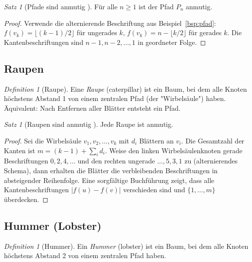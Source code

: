 \documentclass[12pt,a4paper]{amsart}
\theoremstyle{definition}
\theoremstyle{remark}
\newtheorem{satz}[theorem]{Satz}
\newtheorem{definition_de}[theorem]{Definition}
\begin{document}
\begin{satz}[Pfade sind anmutig \cite{Rosa1967}]\label{satz:pfade}
Für alle $n \geq 1$ ist der Pfad $P_n$ anmutig.
\end{satz}

\begin{proof}
Verwende die alternierende Beschriftung aus Beispiel~\ref{bsp:pfad}:
$f(v_k) = \lfloor(k-1)/2\rfloor$ für ungerades $k$,
$f(v_k) = n - \lfloor k/2 \rfloor$ für gerades $k$.
Die Kantenbeschriftungen sind $n-1, n-2, \ldots, 1$ in geordneter Folge.
\end{proof}

\subsection{Raupen}

\begin{definition_de}[Raupe]
Eine \emph{Raupe} (caterpillar) ist ein Baum, bei dem alle Knoten höchstens
Abstand 1 von einem zentralen Pfad (der "Wirbelsäule") haben. Äquivalent:
Nach Entfernen aller Blätter entsteht ein Pfad.
\end{definition_de}

\begin{satz}[Raupen sind anmutig \cite{Rosa1967}]\label{satz:raupen}
Jede Raupe ist anmutig.
\end{satz}

\begin{proof}
Sei die Wirbelsäule $v_1, v_2, \ldots, v_k$ mit $d_i$ Blättern an $v_i$.
Die Gesamtzahl der Kanten ist $m = (k-1) + \sum_i d_i$.
Weise den linken Wirbelsäulenknoten gerade Beschriftungen $0, 2, 4, \ldots$ und
den rechten ungerade $\ldots, 5, 3, 1$ zu (alternierendes Schema), dann erhalten
die Blätter die verbleibenden Beschriftungen in absteigender Reihenfolge.
Eine sorgfältige Buchführung zeigt, dass alle Kantenbeschriftungen $|f(u) - f(v)|$
verschieden sind und $\{1, \ldots, m\}$ überdecken.
\end{proof}

\subsection{Hummer (Lobster)}

\begin{definition_de}[Hummer]
Ein \emph{Hummer} (lobster) ist ein Baum, bei dem alle Knoten höchstens Abstand 2
von einem zentralen Pfad haben.
\end{definition_de}
\end{document}
